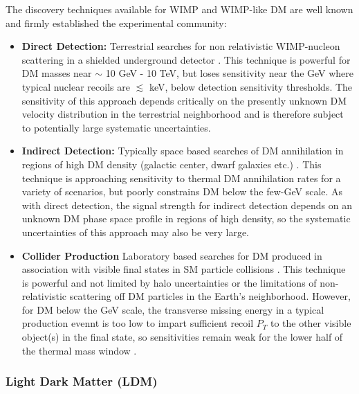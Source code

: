 The discovery techniques available for WIMP and WIMP-like DM are well known and firmly established the experimental community:
\begin{itemize}
\item {\bf Direct Detection:} Terrestrial searches for non relativistic WIMP-nucleon scattering in a shielded underground detector \cite{Undagoitia:2015gya}. This technique 
is powerful for DM masses near $\sim$ 10 GeV - 10 TeV, but loses sensitivity near the GeV where typical nuclear recoils are $\lesssim$ keV,
below detection sensitivity thresholds. The sensitivity of this approach depends critically on the presently unknown DM velocity distribution in the 
terrestrial neighborhood and is therefore subject to potentially large systematic uncertainties. 

\item {\bf Indirect Detection:} Typically space based searches of DM annihilation in regions of high DM density (galactic center, dwarf galaxies etc.) \cite{Conrad:2014tla}.
This technique is approaching sensitivity to thermal DM annihilation rates for a variety of scenarios, but poorly constrains DM below the 
few-GeV scale. As with direct detection, the signal strength for indirect detection depends on an unknown DM phase space profile in regions of high density, 
so the systematic uncertainties of this approach may also be very large. 

\item {\bf Collider Production} Laboratory based searches for DM produced in association with visible final states in SM particle collisions \cite{Askew:2014kqa}. This technique
is powerful and not limited by halo uncertainties or the limitations of non-relativistic scattering off DM particles in the Earth's neighborhood. However, 
for DM below the GeV scale, the transverse missing energy in a typical production evennt is too low to impart sufficient recoil $P_T$ to the other
visible object(s) in the final state, so sensitivities remain weak for the lower half of the thermal mass window \cite{Izaguirre:2015yja}. 

\end{itemize}

\subsubsection{Light Dark Matter (LDM)}

